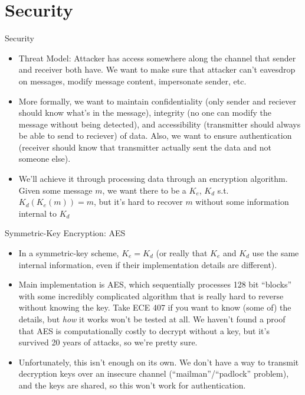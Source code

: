 \documentclass{beamer}
\begin{document}
\section{Security}
\begin{frame}[t]{Security}
    \begin{itemize}
        \item \alert{Threat Model}: Attacker has access somewhere along the channel that sender and receiver both have. We want to make sure that attacker can't eavesdrop on messages, modify message content, impersonate sender, etc.
        \pause\item More formally, we want to maintain \alert{confidentiality} (only sender and reciever should know what's in the message), \alert{integrity} (no one can modify the message without being detected), and \alert{accessibility} (transmitter should always be able to send to reciever) of data. Also, we want to ensure authentication (receiver should know that transmitter actually sent the data and not someone else).
        \pause\item We'll achieve it through processing data through an \alert{encryption algorithm}. Given some message $m$, we want there to be a $K_e$, $K_d$ s.t. $K_d(K_e(m)) = m$, but it's hard to recover $m$ without some information internal to $K_d$
    \end{itemize}
\end{frame}

\begin{frame}[t]{Symmetric-Key Encryption: AES}
    \begin{itemize}
        \item In a \alert{symmetric-key} scheme, $K_e = K_d$ (or really that $K_e$ and $K_d$ use the same internal information, even if their implementation details are different).
        \pause\item Main implementation is \alert{AES}, which sequentially processes 128 bit ``blocks'' with some incredibly complicated algorithm that is really hard to reverse without knowing the key. Take ECE 407 if you want to know (some of) the details, but \textit{how} it works won't be tested at all. We haven't found a proof that AES is computationally costly to decrypt without a key, but it's survived 20 years of attacks, so we're pretty sure.
        \pause\item Unfortunately, this isn't enough on its own. We don't have a way to transmit decryption keys over an insecure channel (``mailman''/``padlock'' problem), and the keys are shared, so this won't work for authentication.
    \end{itemize}
\end{frame}
\end{document}
